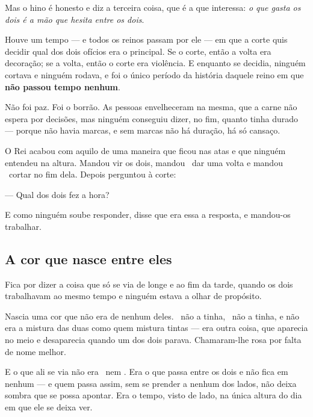 \documentclass[livro.tex]{subfiles}
\begin{document}
Mas o hino é honesto e diz a terceira coisa, que é a que interessa: \emph{o que gasta os dois é a
mão que hesita entre os dois}.

\medskip

Houve um tempo --- e todos os reinos passam por ele --- em que a corte quis decidir qual dos dois
ofícios era o principal. Se o corte, então a volta era decoração; se a volta, então o corte era
violência. E enquanto se decidia, ninguém cortava e ninguém rodava, e foi o único período da
história daquele reino em que \textbf{não passou tempo nenhum}.

\medskip

Não foi paz. Foi o borrão. As pessoas envelheceram na mesma, que a carne não espera por decisões,
mas ninguém conseguiu dizer, no fim, quanto tinha durado --- porque não havia marcas, e sem marcas
não há duração, há só cansaço.

\medskip

O Rei acabou com aquilo de uma maneira que ficou nas atas e que ninguém entendeu na altura.
Mandou vir os dois, mandou \Ben\ dar uma volta e mandou \Drk\ cortar no fim dela. Depois
perguntou à corte:

\medskip

--- Qual dos dois fez a hora?

\medskip

E como ninguém soube responder, disse que era essa a resposta, e mandou-os trabalhar.

\subsection*{A cor que nasce entre eles}

Fica por dizer a coisa que só se via de longe e ao fim da tarde, quando os dois trabalhavam ao
mesmo tempo e ninguém estava a olhar de propósito.

\medskip

Nascia uma cor que não era de nenhum deles. \Drk\ não a tinha, \Ben\ não a tinha, e não era a
mistura das duas como quem mistura tintas --- era outra coisa, que aparecia no meio e desaparecia
quando um dos dois parava. Chamaram-lhe rosa por falta de nome melhor.

\medskip

E o que ali se via não era \Drk\ nem \Ben. Era o que passa entre os dois e não fica em nenhum ---
e quem passa assim, sem se prender a nenhum dos lados, não deixa sombra que se possa apontar. Era
o tempo, visto de lado, na única altura do dia em que ele se deixa ver.
\end{document}
